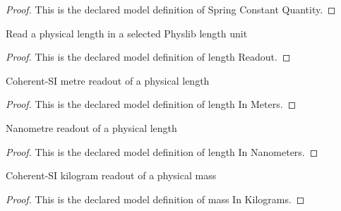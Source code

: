 \begin{proof}
  This is the declared model definition of Spring Constant Quantity.
\end{proof}
\begin{definition}
  \label{def:physics:phyx-mini-0658:phyxminiproblems-problemphyxmini0658-lengthreadout}
  Read a physical length in a selected Physlib length unit
\end{definition}
\begin{proof}
  This is the declared model definition of length Readout.
\end{proof}
\begin{definition}
  \label{def:physics:phyx-mini-0658:phyxminiproblems-problemphyxmini0658-lengthinmeters}
  Coherent-SI metre readout of a physical length
\end{definition}
\begin{proof}
  This is the declared model definition of length In Meters.
\end{proof}
\begin{definition}
  \label{def:physics:phyx-mini-0658:phyxminiproblems-problemphyxmini0658-lengthinnanometers}
  Nanometre readout of a physical length
\end{definition}
\begin{proof}
  This is the declared model definition of length In Nanometers.
\end{proof}
\begin{definition}
  \label{def:physics:phyx-mini-0658:phyxminiproblems-problemphyxmini0658-massinkilograms}
  Coherent-SI kilogram readout of a physical mass
\end{definition}
\begin{proof}
  This is the declared model definition of mass In Kilograms.
\end{proof}
